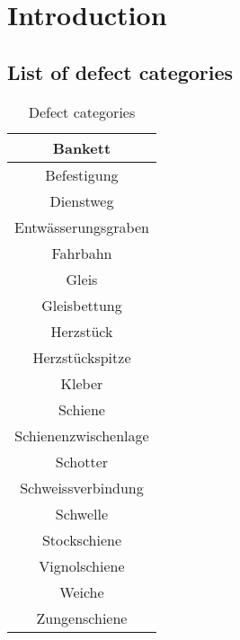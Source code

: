 


\newpage
\cleardoublepage
\appendix
\chapter{Introduction}
\section{List of defect categories}
\begin{table}[H]
	\centering
	\begin{tabular}{|c|} \hline
		Bankett  \\ \hline 
		Befestigung \\ \hline
		Dienstweg \\ \hline
		Entwässerungsgraben \\ \hline
		Fahrbahn \\ \hline
		Gleis \\ \hline
		Gleisbettung \\ \hline
		Herzstück \\ \hline
		Herzstückspitze \\ \hline
		Kleber \\ \hline
		Schiene \\ \hline
		Schienenzwischenlage \\ \hline
		Schotter \\ \hline
		Schweissverbindung \\ \hline
		Schwelle \\ \hline
		Stockschiene \\ \hline
		Vignolschiene \\ \hline
		Weiche \\ \hline
		Zungenschiene \\ \hline
	\end{tabular}
	\caption{Defect categories}
\end{table}


